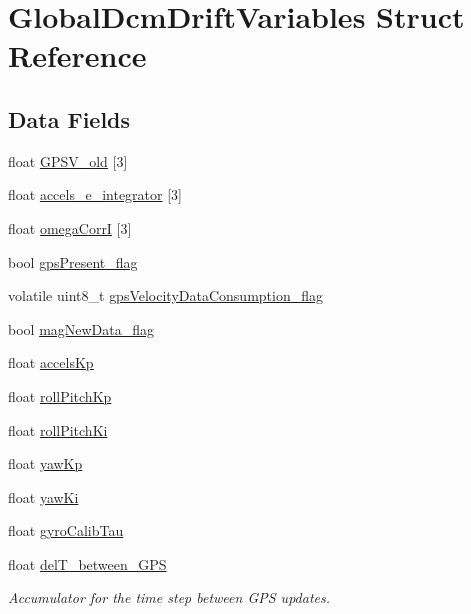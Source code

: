 \hypertarget{struct_global_dcm_drift_variables}{\section{\-Global\-Dcm\-Drift\-Variables \-Struct \-Reference}
\label{struct_global_dcm_drift_variables}
}
\subsection*{\-Data \-Fields}
\begin{DoxyCompactItemize}
\item 
float \hyperlink{struct_global_dcm_drift_variables_afb3e9353cbef8439a6f132ba9af70a3f}{\-G\-P\-S\-V\-\_\-old} \mbox{[}3\mbox{]}
\item 
float \hyperlink{struct_global_dcm_drift_variables_aacbe312b74443ac8368010f90278706e}{accels\-\_\-e\-\_\-integrator} \mbox{[}3\mbox{]}
\item 
float \hyperlink{struct_global_dcm_drift_variables_a08c07c4b4d2fbc994b2eee3f0d4772b1}{omega\-Corr\-I} \mbox{[}3\mbox{]}
\item 
bool \hyperlink{struct_global_dcm_drift_variables_ac7e3400f33023d97c131553ebefc9ce8}{gps\-Present\-\_\-flag}
\item 
volatile uint8\-\_\-t \hyperlink{struct_global_dcm_drift_variables_a27daf6a38cb6e81c64aba4bb8ac9f3fa}{gps\-Velocity\-Data\-Consumption\-\_\-flag}
\item 
bool \hyperlink{struct_global_dcm_drift_variables_a225159950d82f32b3c5fe0d4014488cf}{mag\-New\-Data\-\_\-flag}
\item 
float \hyperlink{struct_global_dcm_drift_variables_a72471dea4e93a3fa653ba73556b61990}{accels\-Kp}
\item 
float \hyperlink{struct_global_dcm_drift_variables_a99a127bcaabe2e53c45a56eb568bc020}{roll\-Pitch\-Kp}
\item 
float \hyperlink{struct_global_dcm_drift_variables_a527cbde51d73c3c3fa34e5ce3b17454a}{roll\-Pitch\-Ki}
\item 
float \hyperlink{struct_global_dcm_drift_variables_af0f020f038b168267dd7f4fab0d26178}{yaw\-Kp}
\item 
float \hyperlink{struct_global_dcm_drift_variables_a81b393df9390fedc959c476b3c7381c6}{yaw\-Ki}
\item 
float \hyperlink{struct_global_dcm_drift_variables_a3b2a14d2ee0eb630e1d8048391e1fdd4}{gyro\-Calib\-Tau}
\item 
float \hyperlink{struct_global_dcm_drift_variables_a00e780a5b38ecb97c9daccd52b0ef4cf}{del\-T\-\_\-between\-\_\-\-G\-P\-S}
\begin{DoxyCompactList}\small\item\em \-Accumulator for the time step between \-G\-P\-S updates. \end{DoxyCompactList}\end{DoxyCompactItemize}


